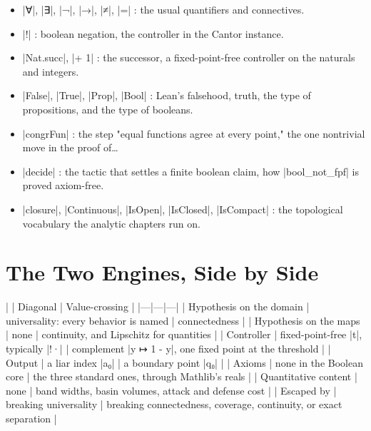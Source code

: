 \documentclass{memoir}
\begin{document}
\begin{itemize}
\item \LeanVerb|∀|, \LeanVerb|∃|, \LeanVerb|¬|, \LeanVerb|→|, \LeanVerb|≠|, \LeanVerb|=| : the usual quantifiers and connectives.
\item \LeanVerb|!| : boolean negation, the controller in the Cantor instance.
\item \LeanVerb|Nat.succ|, \LeanVerb|+ 1| : the successor, a fixed-point-free controller on the naturals
   and integers.
\item \LeanVerb|False|, \LeanVerb|True|, \LeanVerb|Prop|, \LeanVerb|Bool| : Lean's falsehood, truth, the type of
   propositions, and the type of booleans.
\item \LeanVerb|congrFun| : the step "equal functions agree at every point," the one nontrivial
   move in the proof of…
\item \LeanVerb|decide| : the tactic that settles a finite boolean claim, how \LeanVerb|bool_not_fpf| is
   proved axiom-free.
\item \LeanVerb|closure|, \LeanVerb|Continuous|, \LeanVerb|IsOpen|, \LeanVerb|IsClosed|, \LeanVerb|IsCompact| : the topological
   vocabulary the analytic chapters run on.

\end{itemize}




\section{The Two Engines, Side by Side}\label{Two--Schemas--of--Impossibility-005F-005F-005F--Machine--Checked--Limits--of--Trustworthy--Machine--Learning-005F-005F-005F--and--Why--They--Tighten--with--Capability----Appendices----The--Two--Engines-005F-005F-005F--Side--by--Side}

| | Diagonal | Value-crossing |
|---|---|---|
| Hypothesis on the domain | universality: every behavior is named | connectedness |
| Hypothesis on the maps | none | continuity, and Lipschitz for quantities |
| Controller | fixed-point-free \LeanVerb|t|, typically \LeanVerb|!·| | complement \LeanVerb|y ↦ 1 - y|, one fixed point at the threshold |
| Output | a liar index \LeanVerb|a₀| | a boundary point \LeanVerb|q₀| |
| Axioms | none in the Boolean core | the three standard ones, through Mathlib's reals |
| Quantitative content | none | band widths, basin volumes, attack and defense cost |
| Escaped by | breaking universality | breaking connectedness, coverage, continuity, or exact separation |
\end{document}
